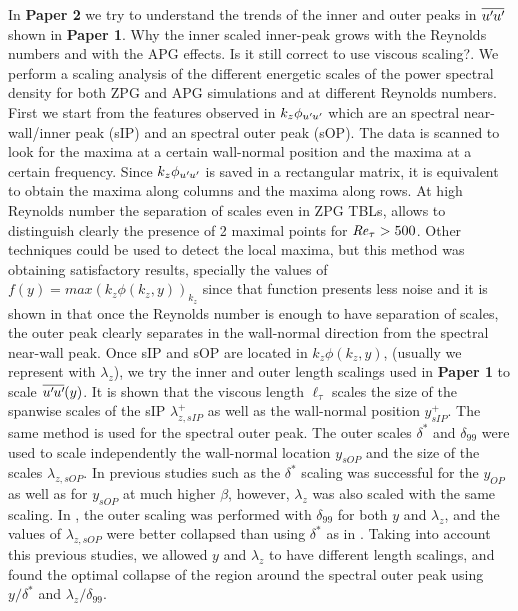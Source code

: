 In \textbf{Paper 2} we try to understand the trends of the inner and outer peaks in $\overline{u^{\prime}\mkern-1.2mu u^{\prime}\mkern-1.2mu}$ shown in \textbf{Paper 1}. Why the inner scaled inner-peak grows with the Reynolds numbers and with the APG effects. Is it still correct to use viscous scaling?. 
We perform a scaling analysis of the different energetic scales of the power spectral density for both ZPG and APG simulations and at different Reynolds numbers.
First we start from the features observed in $k_z\phi_{u^{\prime}\mkern-1.2mu u^{\prime}\mkern-1.2mu}$ which are an spectral near-wall/inner peak (sIP) and an spectral outer peak (sOP). The data is scanned to look for the maxima at a certain wall-normal position and the maxima at a certain frequency. Since $k_z\phi_{u^{\prime}\mkern-1.2mu u^{\prime}\mkern-1.2mu}$ is saved in a rectangular matrix, it is equivalent to obtain the maxima along columns and the maxima along rows.
At high Reynolds number the separation of scales even in ZPG TBLs, allows to distinguish clearly the presence of 2 maximal points for $\mbox{\textit{Re}}_{\tau}>500$. Other techniques could be used to detect the local maxima, but this method was obtaining satisfactory results, specially the values of $f(y)=max(k_z\phi(k_z, y))_{k_z}$ since that function presents less noise and it is shown in  that once the Reynolds number is enough to have separation of scales, the outer peak clearly separates in the wall-normal direction from the spectral near-wall peak.
Once sIP and sOP are located in $k_z\phi(k_z, y)$, (usually we represent with $\lambda_z$), we try the inner and outer length scalings used in \textbf{Paper 1} to scale $\overline{u^{\prime}\mkern-1.2mu u^{\prime}\mkern-1.2mu}(y)$.
It is shown that the viscous length $\ell_{\tau}$ scales the size of the spanwise scales of the sIP $\lambda_{z, sIP}^+$ as well as the wall-normal position $y^+_{sIP}$.
The same method is used for the spectral outer peak. The outer scales $\delta^*$ and $\delta_{99}$ were used to scale independently the wall-normal location $y_{sOP}$ and the size of the scales $\lambda_{z, sOP}$.
In previous studies such as \cite{Kitsios2017} the $\delta^*$ scaling was successful for the $y_{OP}$ as well as for $y_{sOP}$ at much higher $\beta$, however, $\lambda_z$ was also scaled with the same scaling.
In \cite{tanarro_2020}, the outer scaling was performed with $\delta_{99}$ for both $y$ and $\lambda_z$, and the values of $\lambda_{z,sOP}$ were better collapsed than using $\delta^*$ as in \cite{Kitsios2017}.
Taking into account this previous studies, we allowed $y$ and $\lambda_z$ to have different length scalings, and found the optimal collapse of the region around the spectral outer peak using $y/\delta^*$ and $\lambda_z/\delta_{99}$.

